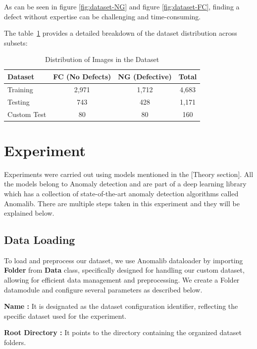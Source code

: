 As can be seen in figure \ref{fig:dataset-NG} and figure \ref{fig:dataset-FC}, finding a defect without expertise can be challenging and time-consuming.

The table~\ref{tab:dataset-distribution} provides a detailed breakdown of the dataset distribution across subsets:

\begin{table}[ht!]
    \centering
    \begin{tabular}{|l|c|c|c|}
        \hline
        \textbf{Dataset} & \textbf{FC (No Defects)} & \textbf{NG (Defective)} & \textbf{Total} \\
        \hline
        Training & 2,971 & 1,712 & 4,683 \\
        \hline
        Testing & 743 & 428 & 1,171 \\
        \hline
        Custom Test & 80 & 80 & 160 \\
        \hline
    \end{tabular}
    \caption{Distribution of Images in the Dataset}
    \label{tab:dataset-distribution}
\end{table}

\section{Experiment}

Experiments were carried out using models mentioned in the [Theory section]. All the models belong to Anomaly detection and are part of a deep learning library which has a collection of state-of-the-art anomaly detection algorithms called Anomalib. There are multiple steps taken in this experiment and they will be explained below.

\subsection{Data Loading}

To load and preprocess our dataset, we use Anomalib dataloader by importing \textbf{Folder} from \textbf{Data} class, specifically designed for handling our custom dataset, allowing for efficient data management and preprocessing. We create a Folder datamodule and configure several parameters as described below.

\textbf{Name :} It is designated as the dataset configuration identifier, reflecting the specific dataset used for the experiment.

\textbf{Root Directory :} It points to the directory containing the organized dataset folders.

